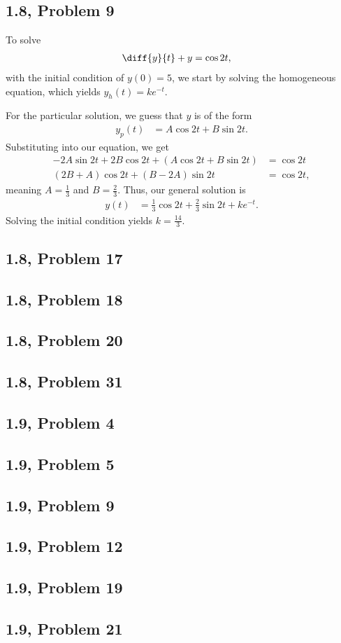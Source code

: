 \documentclass[10pt]{mypackage}
\begin{document}
\subsection{1.8, Problem 9}%
To solve
\begin{align*}
  \diff{y}{t} + y &= \cos 2t,
\end{align*}
with the initial condition of $y(0) = 5$, we start by solving the homogeneous equation, which yields $y_h(t) = ke^{-t}$.\newline

For the particular solution, we guess that $y$ is of the form
\begin{align*}
  y_p(t) &= A\cos 2t + B\sin 2t.
\end{align*}
Substituting into our equation, we get
\begin{align*}
  -2A\sin 2t + 2B\cos 2t + \left(A\cos 2t + B\sin 2t\right) &= \cos 2t\\
  \left(2B + A\right)\cos 2t + \left(B - 2A\right)\sin 2t &= \cos 2t,
\end{align*}
meaning $A = \frac{1}{3}$ and $B = \frac{2}{3}$. Thus, our general solution is
\begin{align*}
  y(t) &= \frac{1}{3}\cos 2t + \frac{2}{3}\sin 2t + ke^{-t}.
\end{align*}
Solving the initial condition yields $k = \frac{14}{3}$.
\subsection{1.8, Problem 17}%
\subsection{1.8, Problem 18}%
\subsection{1.8, Problem 20}%
\subsection{1.8, Problem 31}%
\subsection{1.9, Problem 4}%
\subsection{1.9, Problem 5}%
\subsection{1.9, Problem 9}%
\subsection{1.9, Problem 12}%
\subsection{1.9, Problem 19}%
\subsection{1.9, Problem 21}%
\end{document}

